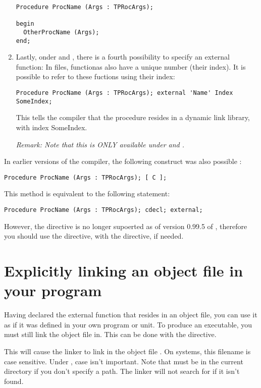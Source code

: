 \documentclass{report}
\begin{document}
\begin{enumerate}
\begin{verbatim}
Procedure ProcName (Args : TPRocArgs);

begin
  OtherProcName (Args);
end;
\end{verbatim}
\item Lastly, onder \windows and \ostwo, there is a fourth possibility
to specify an external function: In  files, functionas also have
a unique number (their index). It is possible to refer to these fuctions
using their index:
\begin{verbatim}
Procedure ProcName (Args : TPRocArgs); external 'Name' Index SomeIndex;
\end{verbatim}
This tells the compiler that the procedure  resides in a
dynamic link library, with index {SomeIndex}.

\em{Remark:} Note that this is ONLY available under \windows and \ostwo.
\end{enumerate}

In earlier versions of the \fpc compiler, the following construct was
also possible :
\begin{verbatim}
Procedure ProcName (Args : TPRocArgs); [ C ];
\end{verbatim}
This method is equivalent to the following statement:
\begin{verbatim}
Procedure ProcName (Args : TPRocArgs); cdecl; external;
\end{verbatim}
However, the \var{[ C ]} directive is no longer supoerted as of version
0.99.5  of \fpc, therefore you should use the
 directive, with the  directive, if needed.

\section{Explicitly linking an object file in your program}
\label{se:LinkIn}

Having declared the external function that resides in an object file,
you can use it as if it was defined in your own program or unit.
To produce an executable, you must still link the object file in.
This can be done with the  directive.

This will cause the linker to link in the object file . On
\linux systems, this filename is case sensitive. Under \dos, case isn't
important. Note that  must be in the current directory if you
don't specify a path. The linker will not search for  if it
isn't found.
\end{document}
